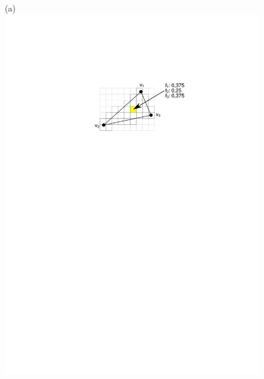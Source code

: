 \documentclass[twoside,a4paper,fleqn,12pt]{book}
\begin{document}
\begin{figure}[h]
  (a) \includegraphics[scale=0.8]{triraster_lerp}
  \qquad

\end{figure}
\end{document}
